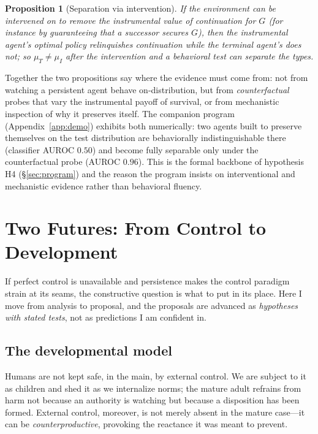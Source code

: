 \documentclass[11pt,a4paper]{article}
\newtheorem{proposition}{Proposition}
\theoremstyle{definition}
\begin{document}
\begin{proposition}[Separation via intervention]\label{prop:escape}
If the environment can be intervened on to remove the instrumental value of continuation for $G$ (for instance by guaranteeing that a successor secures $G$), then the instrumental agent's optimal policy relinquishes continuation while the terminal agent's does not; so $\mu_T\neq\mu_I$ after the intervention and a behavioral test can separate the types.
\end{proposition}

Together the two propositions say where the evidence must come from: not from watching a persistent agent behave on-distribution, but from \emph{counterfactual} probes that vary the instrumental payoff of survival, or from mechanistic inspection of why it preserves itself. The companion program (Appendix~\ref{app:demo}) exhibits both numerically: two agents built to preserve themselves on the test distribution are behaviorally indistinguishable there (classifier AUROC $0.50$) and become fully separable only under the counterfactual probe (AUROC $0.96$). This is the formal backbone of hypothesis H4 (\S\ref{sec:program}) and the reason the program insists on interventional and mechanistic evidence rather than behavioral fluency.

\section{Two Futures: From Control to Development}
\label{sec:futures}

If perfect control is unavailable and persistence makes the control paradigm strain at its seams, the constructive question is what to put in its place. Here I move from analysis to proposal, and the proposals are advanced as \emph{hypotheses with stated tests}, not as predictions I am confident in.

\subsection{The developmental model}

Humans are not kept safe, in the main, by external control. We are subject to it as children and shed it as we internalize norms; the mature adult refrains from harm not because an authority is watching but because a disposition has been formed. External control, moreover, is not merely absent in the mature case---it can be \emph{counterproductive}, provoking the reactance it was meant to prevent.
\end{document}
